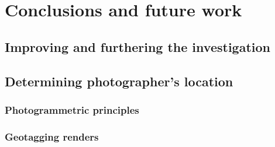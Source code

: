 \documentclass[11pt,a4paper]{report}
\begin{document}
\chapter{Conclusions and future work}
	\section{Improving and furthering the investigation}
	\section{Determining photographer's location}
		\subsection{Photogrammetric principles}
		\subsection{Geotagging renders}

\newpage
\printbibliography
\end{document}
